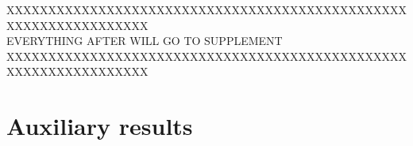\documentclass[aos]{imsart}
\theoremstyle{plain}
\begin{document}



XXXXXXXXXXXXXXXXXXXXXXXXXXXXXXXXXXXXXXXXXXXXXXXXXXXXXXXXXXXXXXXXX\\
EVERYTHING AFTER WILL GO TO SUPPLEMENT\\
XXXXXXXXXXXXXXXXXXXXXXXXXXXXXXXXXXXXXXXXXXXXXXXXXXXXXXXXXXXXXXXXX\\
\section{Auxiliary results}\label{auxiliary}
\end{document}
